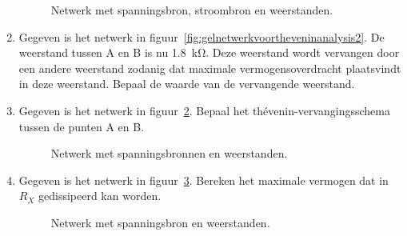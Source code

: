 \begin{enumerate}[labelindent=0pt,labelwidth=\widthof{8.88.\ },label=\textbf{\thechapter.\arabic*.},leftmargin=!,ref=\thechapter.\arabic*]
\begin{figure}[!ht]
\centering
{}
\caption{Netwerk met spanningsbron, stroombron en weerstanden.}
\label{fig:gelsuperpos1}
\end{figure}



\item
\label{que:gelthevenin2b}
Gegeven is het netwerk in figuur~\ref{fig:gelnetwerkvoortheveninanalysis2}. De weerstand tussen A en B is nu \SI{1.8}{\kilo\ohm}. Deze weerstand wordt vervangen door een andere weerstand zodanig dat maximale vermogensoverdracht plaatsvindt in deze weerstand. Bepaal de waarde van de vervangende weerstand.

\item
\label{que:gelthevenin4}
Gegeven is het netwerk in figuur~\ref{fig:gelthevenin4}. Bepaal het thévenin-vervangingsschema tussen de punten A en B.
\begin{figure}[!ht]
\centering
{}
\caption{Netwerk met spanningsbronnen en weerstanden.}
\label{fig:gelthevenin4}
\end{figure}


\item
\label{que:gelthevenin3}
Gegeven is het netwerk in figuur~\ref{fig:gelnetwerkvoortheveninanalysis3}. Bereken het maximale vermogen dat in $R_X$ gedissipeerd kan worden.

\begin{figure}[!ht]
\centering
{}
\caption{Netwerk met spanningsbron en weerstanden.}
\label{fig:gelnetwerkvoortheveninanalysis3}
\end{figure}


\end{enumerate}
